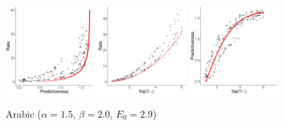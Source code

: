 \documentclass[entropy,article,submit,moreauthors,pdftex,10pt,a4paper]{Definitions/mdpi}
\begin{document}
\begin{figure}
\begin{center}
	\includegraphics[width=0.3\textwidth]{code/figures/ru-words-info-fitted.pdf}
\includegraphics[width=0.3\textwidth]{code/figures/ru-words-nlogbeta-mem-fitted.pdf}
\includegraphics[width=0.3\textwidth]{code/figures/ru-words-nlogbeta-ee-fitted.pdf}

		Arabic {\tiny ($\alpha=1.5$, $\beta=2.0$, $E_0=2.9$)}


\end{center}
\end{figure}
\end{document}
